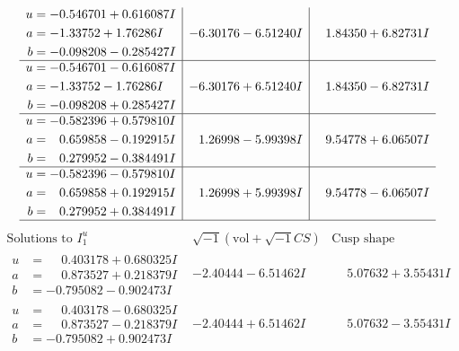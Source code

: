 \documentclass[1p]{elsarticle_modified}
\theoremstyle{definition}
\newcommand{\I}{\sqrt{-1}}
\begin{document}
$$\begin{array}{c|c|c}
\begin{aligned}
u &= -0.546701 + 0.616087 I \\
a &= -1.33752 + 1.76286 I \\
b &= -0.098208 - 0.285427 I\end{aligned}
 & -6.30176 - 6.51240 I & \phantom{-}1.84350 + 6.82731 I \\ \hline\begin{aligned}
u &= -0.546701 - 0.616087 I \\
a &= -1.33752 - 1.76286 I \\
b &= -0.098208 + 0.285427 I\end{aligned}
 & -6.30176 + 6.51240 I & \phantom{-}1.84350 - 6.82731 I \\ \hline\begin{aligned}
u &= -0.582396 + 0.579810 I \\
a &= \phantom{-}0.659858 - 0.192915 I \\
b &= \phantom{-}0.279952 - 0.384491 I\end{aligned}
 & \phantom{-}1.26998 - 5.99398 I & \phantom{-}9.54778 + 6.06507 I \\ \hline\begin{aligned}
u &= -0.582396 - 0.579810 I \\
a &= \phantom{-}0.659858 + 0.192915 I \\
b &= \phantom{-}0.279952 + 0.384491 I\end{aligned}
 & \phantom{-}1.26998 + 5.99398 I & \phantom{-}9.54778 - 6.06507 I\\
 \hline 
 \end{array}$$\newpage$$\begin{array}{c|c|c}  
\text{Solutions to }I^u_{1}& \I (\text{vol} + \sqrt{-1}CS) & \text{Cusp shape}\\
 \hline 
\begin{aligned}
u &= \phantom{-}0.403178 + 0.680325 I \\
a &= \phantom{-}0.873527 + 0.218379 I \\
b &= -0.795082 - 0.902473 I\end{aligned}
 & -2.40444 - 6.51462 I & \phantom{-}5.07632 + 3.55431 I \\ \hline\begin{aligned}
u &= \phantom{-}0.403178 - 0.680325 I \\
a &= \phantom{-}0.873527 - 0.218379 I \\
b &= -0.795082 + 0.902473 I\end{aligned}
 & -2.40444 + 6.51462 I & \phantom{-}5.07632 - 3.55431 I \\ \hline\begin{aligned}

\end{aligned}
\end{array}$$
\end{document}
